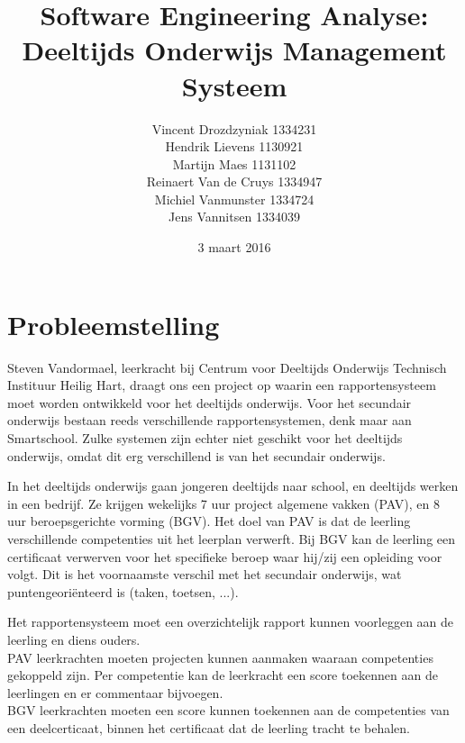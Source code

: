 \documentclass[a4paper]{article}
\title{Software Engineering Analyse: \\ Deeltijds Onderwijs Management Systeem}
\author{Vincent Drozdzyniak 1334231 \\ Hendrik Lievens 1130921 \\ Martijn Maes 1131102 \\ Reinaert Van de Cruys 1334947 \\ Michiel Vanmunster 1334724 \\ Jens Vannitsen 1334039}
\date{3 maart 2016}
\begin{document}
\maketitle



\section{Probleemstelling}
Steven Vandormael, leerkracht bij Centrum voor Deeltijds Onderwijs Technisch Instituur Heilig Hart, draagt ons een project op waarin een rapportensysteem moet worden ontwikkeld voor het deeltijds onderwijs. Voor het secundair onderwijs bestaan reeds verschillende rapportensystemen, denk maar aan Smartschool. Zulke systemen zijn echter niet geschikt voor het deeltijds onderwijs, omdat dit erg verschillend is van het secundair onderwijs.

In het deeltijds onderwijs gaan jongeren deeltijds naar school, en deeltijds werken in een bedrijf. Ze krijgen wekelijks 7 uur project algemene vakken (PAV), en 8 uur beroepsgerichte vorming (BGV). Het doel van PAV is dat de leerling verschillende competenties uit het leerplan verwerft. Bij BGV kan de leerling een certificaat verwerven voor het specifieke beroep waar hij/zij een opleiding voor volgt. Dit is het voornaamste verschil met het secundair onderwijs, wat puntengeoriënteerd is (taken, toetsen, ...).

Het rapportensysteem moet een overzichtelijk rapport kunnen voorleggen aan de leerling en diens ouders.\\
PAV leerkrachten moeten projecten kunnen aanmaken waaraan competenties gekoppeld zijn. Per competentie kan de leerkracht een score toekennen aan de leerlingen en er commentaar bijvoegen.\\
BGV leerkrachten moeten een score kunnen toekennen aan de competenties van een deelcerticaat, binnen het certificaat dat de leerling tracht te behalen.\\

\newpage
\end{document}
